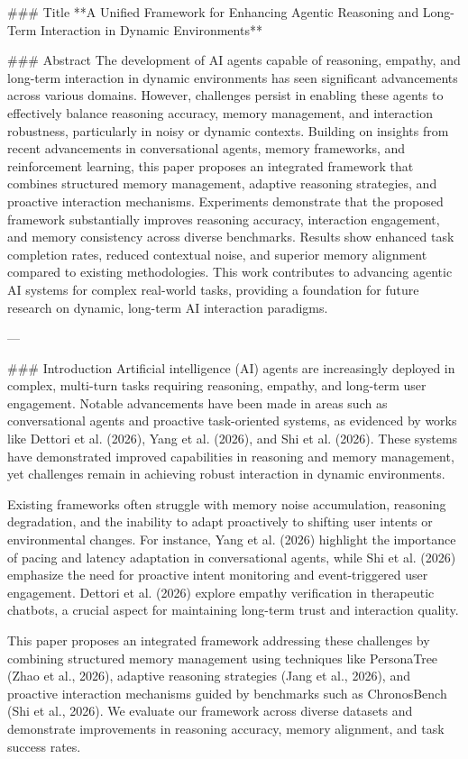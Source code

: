 ### Title  
**A Unified Framework for Enhancing Agentic Reasoning and Long-Term Interaction in Dynamic Environments**

### Abstract  
The development of AI agents capable of reasoning, empathy, and long-term interaction in dynamic environments has seen significant advancements across various domains. However, challenges persist in enabling these agents to effectively balance reasoning accuracy, memory management, and interaction robustness, particularly in noisy or dynamic contexts. Building on insights from recent advancements in conversational agents, memory frameworks, and reinforcement learning, this paper proposes an integrated framework that combines structured memory management, adaptive reasoning strategies, and proactive interaction mechanisms. Experiments demonstrate that the proposed framework substantially improves reasoning accuracy, interaction engagement, and memory consistency across diverse benchmarks. Results show enhanced task completion rates, reduced contextual noise, and superior memory alignment compared to existing methodologies. This work contributes to advancing agentic AI systems for complex real-world tasks, providing a foundation for future research on dynamic, long-term AI interaction paradigms.

---

### Introduction  
Artificial intelligence (AI) agents are increasingly deployed in complex, multi-turn tasks requiring reasoning, empathy, and long-term user engagement. Notable advancements have been made in areas such as conversational agents and proactive task-oriented systems, as evidenced by works like Dettori et al. (2026), Yang et al. (2026), and Shi et al. (2026). These systems have demonstrated improved capabilities in reasoning and memory management, yet challenges remain in achieving robust interaction in dynamic environments.

Existing frameworks often struggle with memory noise accumulation, reasoning degradation, and the inability to adapt proactively to shifting user intents or environmental changes. For instance, Yang et al. (2026) highlight the importance of pacing and latency adaptation in conversational agents, while Shi et al. (2026) emphasize the need for proactive intent monitoring and event-triggered user engagement. Dettori et al. (2026) explore empathy verification in therapeutic chatbots, a crucial aspect for maintaining long-term trust and interaction quality.

This paper proposes an integrated framework addressing these challenges by combining structured memory management using techniques like PersonaTree (Zhao et al., 2026), adaptive reasoning strategies (Jang et al., 2026), and proactive interaction mechanisms guided by benchmarks such as ChronosBench (Shi et al., 2026). We evaluate our framework across diverse datasets and demonstrate improvements in reasoning accuracy, memory alignment, and task success rates.

